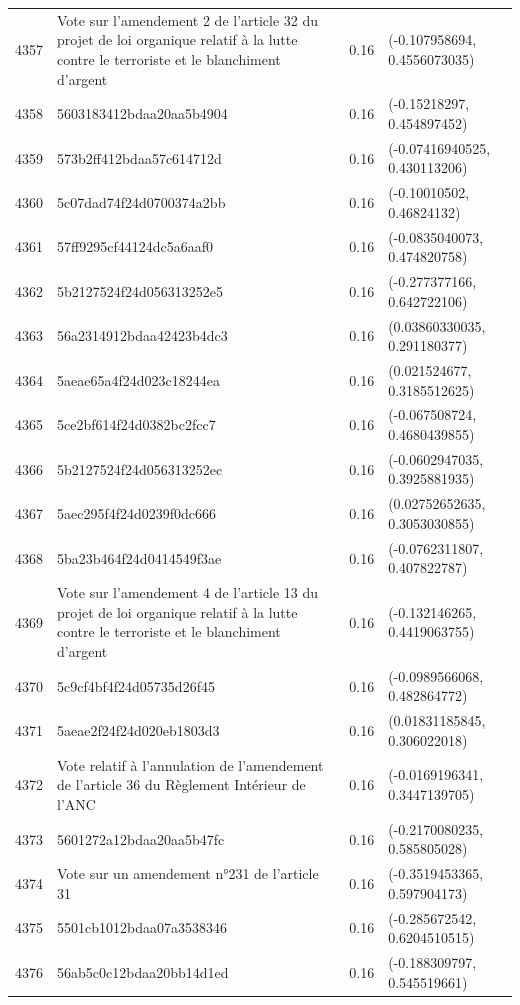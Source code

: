 \begin{table}[ht]
\begin{tabular}{rlrl}
  4357 & Vote sur l'amendement 2 de l'article 32 du projet de loi organique relatif à la lutte contre le terroriste et le blanchiment d'argent & 0.16 & (-0.107958694, 0.4556073035) \\ 
  4358 & 5603183412bdaa20aa5b4904 & 0.16 & (-0.15218297, 0.454897452) \\ 
  4359 & 573b2ff412bdaa57c614712d & 0.16 & (-0.07416940525, 0.430113206) \\ 
  4360 & 5c07dad74f24d0700374a2bb & 0.16 & (-0.10010502, 0.46824132) \\ 
  4361 & 57ff9295cf44124dc5a6aaf0 & 0.16 & (-0.0835040073, 0.474820758) \\ 
  4362 & 5b2127524f24d056313252e5 & 0.16 & (-0.277377166, 0.642722106) \\ 
  4363 & 56a2314912bdaa42423b4dc3 & 0.16 & (0.03860330035, 0.291180377) \\ 
  4364 & 5aeae65a4f24d023c18244ea & 0.16 & (0.021524677, 0.3185512625) \\ 
  4365 & 5ce2bf614f24d0382bc2fcc7 & 0.16 & (-0.067508724, 0.4680439855) \\ 
  4366 & 5b2127524f24d056313252ec & 0.16 & (-0.0602947035, 0.3925881935) \\ 
  4367 & 5aec295f4f24d0239f0dc666 & 0.16 & (0.02752652635, 0.3053030855) \\ 
  4368 & 5ba23b464f24d0414549f3ae & 0.16 & (-0.0762311807, 0.407822787) \\ 
  4369 & Vote sur l'amendement 4 de l'article 13 du projet de loi organique relatif à la lutte contre le terroriste et le blanchiment d'argent & 0.16 & (-0.132146265, 0.4419063755) \\ 
  4370 & 5c9cf4bf4f24d05735d26f45 & 0.16 & (-0.0989566068, 0.482864772) \\ 
  4371 & 5aeae2f24f24d020eb1803d3 & 0.16 & (0.01831185845, 0.306022018) \\ 
  4372 & Vote relatif à l'annulation de l'amendement de l'article 36 du Règlement Intérieur de l'ANC & 0.16 & (-0.0169196341, 0.3447139705) \\ 
  4373 & 5601272a12bdaa20aa5b47fc & 0.16 & (-0.2170080235, 0.585805028) \\ 
  4374 & Vote sur un amendement n°231 de l'article 31 & 0.16 & (-0.3519453365, 0.597904173) \\ 
  4375 & 5501cb1012bdaa07a3538346 & 0.16 & (-0.285672542, 0.6204510515) \\ 
  4376 & 56ab5c0c12bdaa20bb14d1ed & 0.16 & (-0.188309797, 0.545519661) \\ 

\end{tabular}
\end{table}
